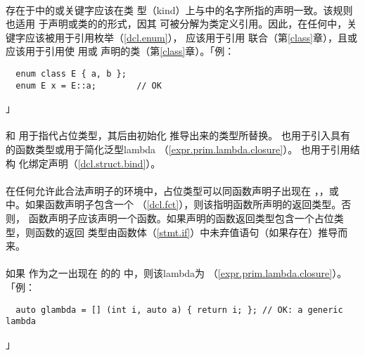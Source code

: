 \paragraph{}
存在于中的或关键字应该在类
型（kind）上与中的名字所指的声明一致。该规则也适用
于声明或类的的形式，因其
可被分解为类定义引用。因此，在任何中，关
键字应该被用于引用枚举（\ref{dcl.enum}）， 应该用于引用
联合（第\ref{class}章），且或 应该用于引用使
用或 声明的类（第\ref{class}章）。「例：
\begin{lstlisting}
  enum class E { a, b };
  enum E x = E::a;        // OK
\end{lstlisting}」

\paragraph{}
和 用于指代占位类型，其后由初始化
推导出来的类型所替换。 也用于引入具有
的函数类型或用于简化泛型lambda
（\ref{expr.prim.lambda.closure}）。 也用于引用结构
化绑定声明（\ref{dcl.struct.bind}）。

\paragraph{}
在任何允许此合法声明子的环境中，占位类型可以同函数声明子出现在
，，或
中。如果函数声明子包含一个
（\ref{dcl.fct}），则该指明函数所声明的返回类型。否则，
函数声明子应该声明一个函数。如果声明的函数返回类型包含一个占位类型，则函数的返回
类型由函数体（\ref{stmt.if}）中未弃值语句（如果存在）推导而来。

\paragraph{}
如果 作为之一出现在
的的
中，则该lambda为
（\ref{expr.prim.lambda.closure}）。「例：
\begin{lstlisting}
  auto glambda = [] (int i, auto a) { return i; }; // OK: a generic lambda
\end{lstlisting}」

